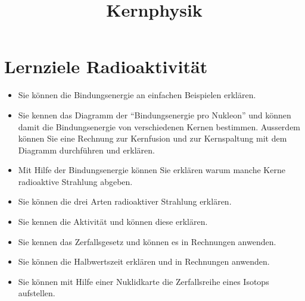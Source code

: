 \documentclass[12pt,a4paper,twoside]{article}
\title{Kernphysik}
\date{}
\begin{document}
\section*{Lernziele Radioaktivität}

\begin{itemize}
	\item Sie können die Bindungsenergie an einfachen Beispielen erklären.
	\item Sie kennen das Diagramm der ``Bindungsenergie pro Nukleon'' und können damit
		die Bindungsenergie von verschiedenen Kernen bestimmen.
		Ausserdem können Sie eine Rechnung zur Kernfusion und zur Kernspaltung mit dem Diagramm durchführen und erklären.
	\item Mit Hilfe der Bindungsenergie können Sie erklären warum manche Kerne radioaktive Strahlung abgeben.
		
	\item Sie können die drei Arten radioaktiver Strahlung erklären.
	
	\item Sie kennen die Aktivität und können diese erklären.

	\item Sie kennen das Zerfallsgesetz und können es in Rechnungen anwenden.

	\item Sie können die Halbwertszeit erklären und in Rechnungen anwenden.

	\item Sie können mit Hilfe einer Nuklidkarte die Zerfallsreihe eines Isotops aufstellen.

\end{itemize}
\end{document}
